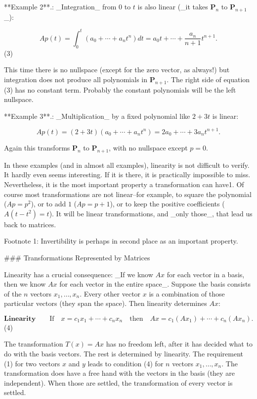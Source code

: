 

**Example 2**.: _Integration_ from \(0\) to \(t\) is also linear (_it takes \(\textbf{P}_{n}\) to \(\textbf{P}_{n+1}\)_):

\[Ap(t)=\int_{0}^{t}(a_{0}+\cdots+a_{n}t^{n})dt=a_{0}t+\cdots+\frac{a_{n}}{n+1}t^{ n+1}.\] (3)

This time there is no nullspace (except for the zero vector, as always!) but integration does not produce all polynomials in \(\textbf{P}_{n+1}\). The right side of equation (3) has no constant term. Probably the constant polynomials will be the left nullspace.

**Example 3**.: _Multiplication_ by a fixed polynomial like \(2+3t\) is linear:

\[Ap(t)=(2+3t)(a_{0}+\cdots+a_{n}t^{n})=2a_{0}+\cdots+3a_{n}t^{n+1}.\]

Again this transforms \(\textbf{P}_{n}\) to \(\textbf{P}_{n+1}\), with no nullspace except \(p=0\).

In these examples (and in almost all examples), linearity is not difficult to verify. It hardly even seems interesting. If it is there, it is practically impossible to miss. Nevertheless, it is the most important property a transformation can have1. Of course most transformations are not linear--for example, to square the polynomial (\(Ap=p^{2}\)), or to add \(1\) (\(Ap=p+1\)), or to keep the positive coefficients (\(A(t-t^{2})=t\)). It will be linear transformations, and _only those_, that lead us back to matrices.

Footnote 1: Invertibility is perhaps in second place as an important property.

### Transformations Represented by Matrices

Linearity has a crucial consequence: _If we know \(Ax\) for each vector in a basis, then we know \(Ax\) for each vector in the entire space_. Suppose the basis consists of the \(n\) vectors \(x_{1},\ldots,x_{n}\). Every other vector \(x\) is a combination of those particular vectors (they span the space). Then linearity determines \(Ax\):

\[\textbf{Linearity}\qquad\text{If}\quad x=c_{1}x_{1}+\cdots+c_{n}x_{n}\quad \text{then}\quad Ax=c_{1}(Ax_{1})+\cdots+c_{n}(Ax_{n}).\] (4)

The transformation \(T(x)=Ax\) has no freedom left, after it has decided what to do with the basis vectors. The rest is determined by linearity. The requirement (1) for two vectors \(x\) and \(y\) leads to condition (4) for \(n\) vectors \(x_{1},\ldots,x_{n}\). The transformation does have a free hand with the vectors in the basis (they are independent). When those are settled, the transformation of every vector is settled.

